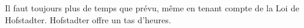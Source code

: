 %
    {Il faut toujours plus de temps que prévu, même en tenant compte de la Loi de Hofstadter.}%
    {Hofstadter offre un tas d'heures.}
